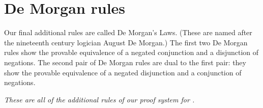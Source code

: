 \section{De Morgan rules}
Our final additional rules are called De Morgan's Laws. (These are named after the nineteenth century logician August De Morgan.) The first two De Morgan rules show the provable equivalence of a negated conjunction and a disjunction of negations.
The second pair of De Morgan rules are dual to the first pair: they show the provable equivalence of a negated disjunction and a conjunction of negations.

\emph{These are all of the additional rules of our proof system for \TFL.}

